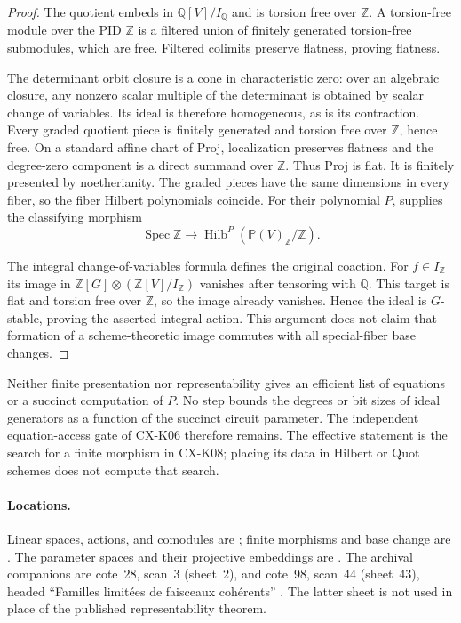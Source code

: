 \begin{proof}
The quotient embeds in $\mathbb Q[V]/I_{\mathbb Q}$ and is torsion free
over $\mathbb Z$.  A torsion-free module over the PID $\mathbb Z$ is a
filtered union of finitely generated torsion-free submodules, which are
free.  Filtered colimits preserve flatness, proving flatness.

The determinant orbit closure is a cone in characteristic zero: over an
algebraic closure, any nonzero scalar multiple of the determinant is
obtained by scalar change of variables.  Its ideal is therefore homogeneous,
as is its contraction.  Every graded quotient piece is finitely generated
and torsion free over $\mathbb Z$, hence free.  On a standard affine chart
of Proj, localization preserves flatness and the degree-zero component is
a direct summand over $\mathbb Z$.  Thus Proj is flat.  It is finitely
presented by noetherianity.  The graded pieces have the same dimensions in
every fiber, so the fiber Hilbert polynomials coincide.  For their polynomial
$P$, \cite[\S3, Theorem~3.2]{FGA221} supplies the classifying morphism
\[
 \operatorname{Spec}\mathbb Z\longrightarrow
 \operatorname{Hilb}^{P}(\mathbb P(V)_{\mathbb Z}/\mathbb Z).
\]

The integral change-of-variables formula defines the original coaction.
For $f\in I_{\mathbb Z}$ its image in
$\mathbb Z[G]\otimes(\mathbb Z[V]/I_{\mathbb Z})$ vanishes after tensoring
with $\mathbb Q$.  This target is flat and torsion free over $\mathbb Z$,
so the image already vanishes.  Hence the ideal is $G$-stable, proving the
asserted integral action.  This argument does not claim that formation of
a scheme-theoretic image commutes with all special-fiber base changes.
\end{proof}

Neither finite presentation nor representability gives an efficient list
of equations or a succinct computation of $P$.  No step bounds the degrees
or bit sizes of ideal generators as a function of the succinct circuit
parameter.  The independent equation-access gate of CX-K06 therefore remains.
The effective statement is the search for a finite morphism in CX-K08;
placing its data in Hilbert or Quot schemes does not compute that search.

\paragraph{Locations.}
Linear spaces, actions, and comodules are
\cite[Exp.~I 4.6.3.1, 4.7.1--4.7.2]{SGA3}; finite morphisms and base change
are \cite[6.1.4--6.1.5]{EGA2}.  The parameter spaces and their projective
embeddings are \cite[\S3, Theorems~3.1--3.2, pp.~259--260;
Proposition~3.8, p.~265]{FGA221}.
The archival companions are cote~28, scan~3 (sheet~2), and cote~98,
scan~44 (sheet~43), headed ``Familles limit\'ees de faisceaux coh\'erents''
\cite{Archive28,Archive98}.  The latter sheet is not used in place of the
published representability theorem.

